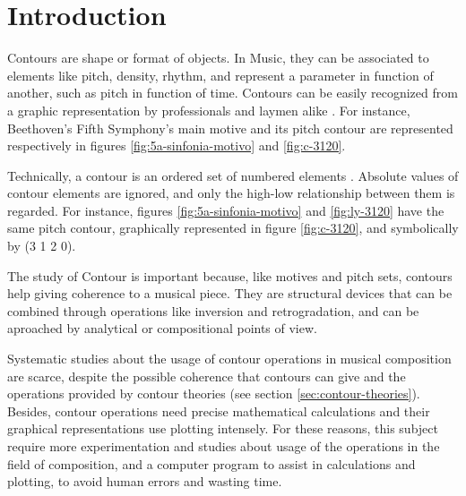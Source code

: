 

\section{Introduction}
\label{sec:introduction}

Contours are shape or format of objects. In Music, they can be
associated to elements like pitch, density, rhythm, and represent a
parameter in function of another, such as pitch in function of
time. Contours can be easily recognized from a graphic representation
by professionals and laymen alike \cite{marvin88:generalized}. For
instance, Beethoven's Fifth Symphony's main motive and its pitch
contour are represented respectively in figures
\ref{fig:5a-sinfonia-motivo} and \ref{fig:c-3120}.

Technically, a contour is an ordered set of numbered elements
\cite{morris93:directions}. Absolute values of contour elements are
ignored, and only the high-low relationship between them is
regarded. For instance, figures \ref{fig:5a-sinfonia-motivo} and
\ref{fig:ly-3120} have the same pitch contour, graphically represented
in figure \ref{fig:c-3120}, and symbolically by (3 1 2 0).

The study of Contour is important because, like motives and pitch
sets, contours help giving coherence to a musical piece. They are
structural devices that can be combined through operations like
inversion and retrogradation, and can be aproached by analytical or
compositional points of view.

Systematic studies about the usage of contour operations in musical
composition are scarce, despite the possible coherence that contours
can give and the
operations provided by contour theories (see section
\ref{sec:contour-theories}). Besides, contour operations need precise
mathematical calculations and their graphical representations use
plotting intensely. For these reasons, this subject require more
experimentation and studies about usage of the operations in the field
of composition, and a computer program to assist in calculations and
plotting, to avoid human errors and wasting time.


